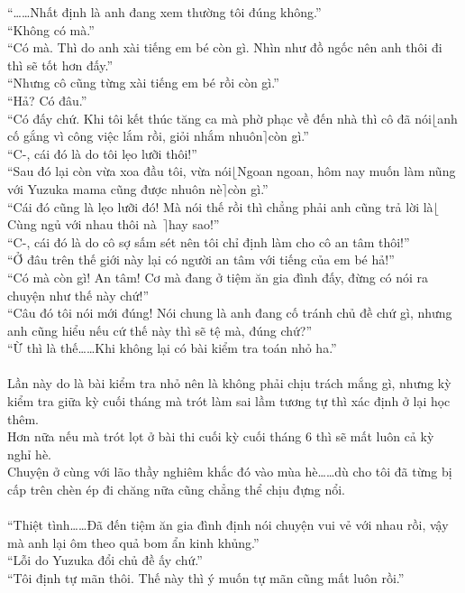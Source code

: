 \documentclass[12pt,a4paper, twosides]{book}
\begin{document}
“……Nhất định là anh đang xem thường tôi đúng không.”\\
“Không có mà.”\\
“Có mà. Thì do anh xài tiếng em bé còn gì. Nhìn như đồ ngốc nên anh thôi đi thì sẽ tốt hơn đấy.”\\
“Nhưng cô cũng từng xài tiếng em bé rồi còn gì.”\\
“Hả? Có đâu.”\\
“Có đấy chứ. Khi tôi kết thúc tăng ca mà phờ phạc về đến nhà thì cô đã nói$\lfloor$anh cố gắng vì công việc lắm rồi, giỏi nhắm nhuôn$\rceil$còn gì.”\\
“C-, cái đó là do tôi lẹo lưỡi thôi!”\\
“Sau đó lại còn vừa xoa đầu tôi, vừa nói$\lfloor$Ngoan ngoan, hôm nay muốn làm nũng với Yuzuka mama cũng được nhuôn nè$\rceil$còn gì.”\\
“Cái đó cũng là lẹo lưỡi đó! Mà nói thế rồi thì chẳng phải anh cũng trả lời là$\lfloor$Cùng ngủ với nhau thôi nà~$\rceil$hay sao!”\\
“C-, cái đó là do cô sợ sấm sét nên tôi chỉ định làm cho cô an tâm thôi!”\\
“Ở đâu trên thế giới này lại có người an tâm với tiếng của em bé hả!”\\
“Có mà còn gì! An tâm! Cơ mà đang ở tiệm ăn gia đình đấy, đừng có nói ra chuyện như thế này chứ!”\\
“Câu đó tôi nói mới đúng! Nói chung là anh đang cố tránh chủ đề chứ gì, nhưng anh cũng hiểu nếu cứ thế này thì sẽ tệ mà, đúng chứ?”\\
“Ừ thì là thế……Khi không lại có bài kiểm tra toán nhỏ ha.”\\
\\
Lần này do là bài kiểm tra nhỏ nên là không phải chịu trách mắng gì, nhưng kỳ kiểm tra giữa kỳ cuối tháng mà trót làm sai lầm tương tự thì xác định ở lại học thêm.\\
Hơn nữa nếu mà trót lọt ở bài thi cuối kỳ cuối tháng 6 thì sẽ mất luôn cả kỳ nghỉ hè.\\
Chuyện ở cùng với lão thầy nghiêm khắc đó vào mùa hè……dù cho tôi đã từng bị cấp trên chèn ép đi chăng nữa cũng chẳng thể chịu đựng nổi.\\
\\
“Thiệt tình……Đã đến tiệm ăn gia đình định nói chuyện vui vẻ với nhau rồi, vậy mà anh lại ôm theo quả bom ẩn kinh khủng.”\\
“Lỗi do Yuzuka đổi chủ đề ấy chứ.”\\
“Tôi định tự mãn thôi. Thế này thì ý muốn tự mãn cũng mất luôn rồi.”\\
\end{document}
